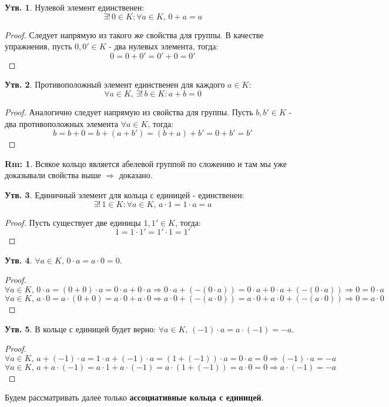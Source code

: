 \documentclass[12pt]{article}
\theoremstyle{definition}
\newtheorem{rem}{Rm:}
\newtheorem{prop}{Утв.}
\begin{document}
\begin{prop}
	Нулевой элемент единственен:
	$$
		\exists! \, 0 \in K \colon \forall a \in K, \,  0 + a = a
	$$
\end{prop}
\begin{proof}
	Следует напрямую из такого же свойства для группы. В качестве упражнения, пусть $0, 0' \in K$ - два нулевых элемента, тогда:
	$$
		0 = 0 + 0' = 0' + 0 = 0'
	$$
\end{proof}

\begin{prop}
	Противоположный элемент единственен для каждого $a\in K$:
	$$
		\forall a \in K, \, \exists !\, b \in K \colon a + b = 0
	$$
\end{prop}
\begin{proof}
	Аналогично следует напрямую из свойства для группы. Пусть $b, b' \in K$ - два противоположных элемента $\forall a \in K$, тогда:
	$$
		b  = b + 0 =  b + (a + b') = (b + a) + b' = 0 + b' = b'
	$$
\end{proof}
\begin{rem}
	Всякое кольцо является абелевой группой по сложению и там мы уже доказывали свойства выше $\Rightarrow$ доказано.
\end{rem}

\begin{prop}
	Единичный элемент для кольца с единицей - единственен:
	$$
		\exists! \, 1 \in K \colon \forall a \in K, \, a{\cdot}1 = 1{\cdot}a = a
	$$
\end{prop}
\begin{proof}
	Пусть существует две единицы $1,1' \in K$, тогда:
	$$
		1 = 1{\cdot}1' = 1'{\cdot}1 = 1'
	$$
\end{proof}

\begin{prop}
	$\forall a \in K, \, 0{\cdot}a = a{\cdot}0 = 0$.
\end{prop}
\begin{proof}
	$$
		\forall a \in K, \, 0{\cdot}a = (0 + 0){\cdot}a = 0{\cdot}a + 0{\cdot}a \Rightarrow 0{\cdot}a + (-(0{\cdot}a)) = 0{\cdot}a + 0{\cdot}a + (-(0{\cdot}a)) \Rightarrow 0 = 0{\cdot}a
	$$
	$$
		\forall a \in K, \, a{\cdot}0 = a{\cdot}(0 + 0) = a{\cdot}0 + a{\cdot}0 \Rightarrow a{\cdot}0 + (-(a{\cdot}0)) = a{\cdot}0 + a{\cdot}0 + (-(a{\cdot}0)) \Rightarrow 0 = a{\cdot}0 
	$$
\end{proof}
\begin{prop}
	В кольце с единицей будет верно: $\forall a \in K, \, (-1){\cdot}a =a{\cdot}(-1)= -a$.
\end{prop}
\begin{proof}
	$$
		\forall a\in K, \, a + (-1){\cdot}a = 1{\cdot}a + (-1){\cdot}a = (1 + (-1)){\cdot}a = 0{\cdot}a = 0 \Rightarrow (-1){\cdot}a = -a
	$$
	$$
		\forall a\in K, \, a + a{\cdot}(-1) = a{\cdot}1 + a{\cdot}(-1) = a{\cdot}(1 + (-1)) = a{\cdot}0 = 0 \Rightarrow a{\cdot}(-1) = -a
	$$
\end{proof}
Будем рассматривать далее только\textbf{ ассоциативные кольца с единицей}.
\end{document}
